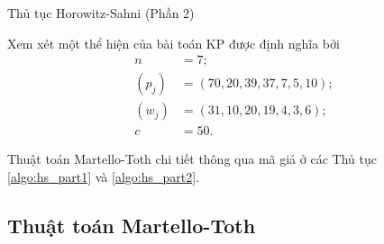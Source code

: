 \begin{algorithm}[!ht]
    \caption{Thủ tục Horowitz-Sahni (Phần 2)}
    \label{algo:hs_part2}
\end{algorithm}

\begin{example}
    Xem xét một thể hiện của bài toán KP được định nghĩa bởi 
    \begin{align*}
        n &= 7;\\
        (p_j) &= (70, 20, 39, 37, 7, 5, 10);\\
        (w_j) &= (31, 10, 20, 19, 4, 3, 6);\\
        c &= 50.
    \end{align*}
\end{example}

Thuật toán Martello-Toth chi tiết thông qua mã giả ở các Thủ tục \ref{algo:hs_part1} và \ref{algo:hs_part2}.

\subsection{Thuật toán Martello-Toth}

